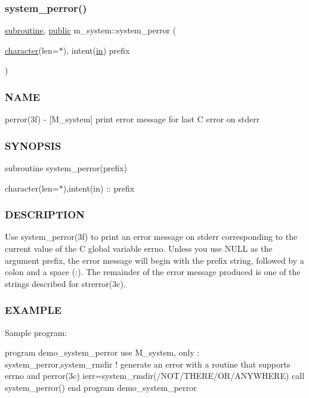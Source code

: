 \subsubsection{\texorpdfstring{system\+\_\+perror()}{system\_perror()}}
{\footnotesize\ttfamily \hyperlink{M__stopwatch_83_8txt_acfbcff50169d691ff02d4a123ed70482}{subroutine}, \hyperlink{M__stopwatch_83_8txt_a2f74811300c361e53b430611a7d1769f}{public} m\+\_\+system\+::system\+\_\+perror (\begin{DoxyParamCaption}\item[{\hyperlink{option__stopwatch_83_8txt_abd4b21fbbd175834027b5224bfe97e66}{character}(len=$\ast$), intent(\hyperlink{M__journal_83_8txt_afce72651d1eed785a2132bee863b2f38}{in})}]{prefix }\end{DoxyParamCaption})}



\subsubsection*{N\+A\+ME}

perror(3f) -\/ \mbox{[}M\+\_\+system\mbox{]} print error message for last C error on stderr \subsubsection*{S\+Y\+N\+O\+P\+S\+IS}

subroutine system\+\_\+perror(prefix)

character(len=$\ast$),intent(in) \+:\+: prefix

\subsubsection*{D\+E\+S\+C\+R\+I\+P\+T\+I\+ON}

Use system\+\_\+perror(3f) to print an error message on stderr corresponding to the current value of the C global variable errno. Unless you use N\+U\+LL as the argument prefix, the error message will begin with the prefix string, followed by a colon and a space (\+:). The remainder of the error message produced is one of the strings described for strerror(3c).

\subsubsection*{E\+X\+A\+M\+P\+LE}

Sample program\+:

program demo\+\_\+system\+\_\+perror use M\+\_\+system, only \+: system\+\_\+perror,system\+\_\+rmdir ! generate an error with a routine that supports errno and perror(3c) ierr=system\+\_\+rmdir(\textquotesingle{}/\+N\+O\+T/\+T\+H\+E\+R\+E/\+O\+R/\+A\+N\+Y\+W\+H\+E\+RE\textquotesingle{}) call system\+\_\+perror(\textquotesingle{}) end program demo\+\_\+system\+\_\+perror

